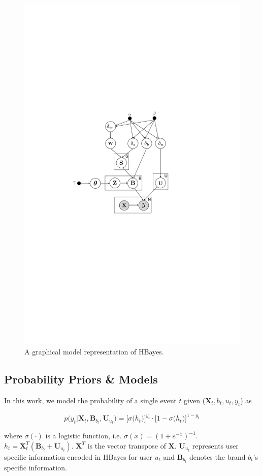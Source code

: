 \begin{figure}[htb]
\includegraphics[width=0.8\linewidth]{fig/model}
\caption{A graphical model representation of HBayes.}
\label{fig:model}
\end{figure}

\subsection{Probability Priors \& Models}

In this work, we model the probability of a single event $t$ given ($\mathbf{X}_t, b_t, u_t, y_t$) as 

\begin{equation}
\label{eq:sigmoid_prob}
p\big(y_t|\bm{X}_t,\bm{B}_{b_t},\bm{U}_{u_t} \big)= \Big[\sigma\big(h_t\big)\Big]^{y_t} \cdot \Big[1-\sigma\big(h_t\big)\Big]^{1-y_t}
\end{equation}

\noindent where $\sigma(\cdot)$ is a logistic function, i.e. $\sigma(x)=(1+e^{-x})^{-1}$. $h_{t}=\bm{X}_t^T(\bm{B}_{b_t}+\bm{U}_{u_t})$. $\mathbf{X}^T$ is the vector transpose of $\mathbf{X}$. $\bm{U}_{u_t}$ represents user specific information encoded in HBayes for user $u_t$ and $\bm{B}_{b_t}$ denotes the brand $b_t$'s specific information.

